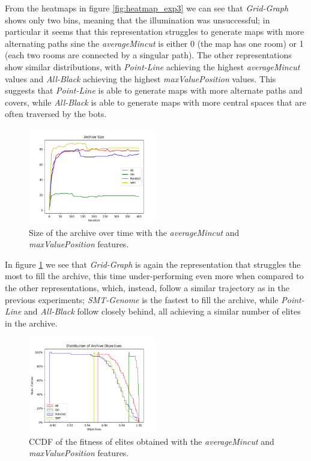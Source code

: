 From the heatmaps in figure \ref{fig:heatmap_exp3} we can see that \textit{Grid-Graph} shows only two bins, meaning that the illumination was unsuccessful; in particular it seems that this representation struggles to generate maps with more alternating paths sine the \textit{averageMincut} is either 0 (the map has one room) or 1 (each two rooms are connected by a singular path). The other representations show similar distributions, with \textit{Point-Line} achieving the highest \textit{averageMincut} values and \textit{All-Black} achieving the highest \textit{maxValuePosition} values. This suggests that \textit{Point-Line} is able to generate maps with more alternate paths and covers, while \textit{All-Black} is able to generate maps with more central spaces that are often traversed by the bots.

\begin{figure}[H]
    \centering
    \includegraphics[width=0.5\textwidth]{images/Exp3/archive_size.png}
    \caption{Size of the archive over time with the \textit{averageMincut} and \textit{maxValuePosition} features.}
    \label{fig:archive_size_exp3}
\end{figure}

In figure \ref{fig:archive_size_exp3} we see that \textit{Grid-Graph} is again the representation that struggles the most to fill the archive, this time under-performing even more when compared to the other representations, which, instead, follow a similar trajectory as in the previous experiments; \textit{SMT-Genome} is the fastest to fill the archive, while \textit{Point-Line} and \textit{All-Black} follow closely behind, all achieving a similar number of elites in the archive.

\begin{figure}[H]
    \centering
    \includegraphics[width=0.5\textwidth]{images/Exp3/archive_ccdf.png}
    \caption{CCDF of the fitness of elites obtained with the \textit{averageMincut} and \textit{maxValuePosition} features.}
    \label{fig:ccdf_exp3}
\end{figure}


